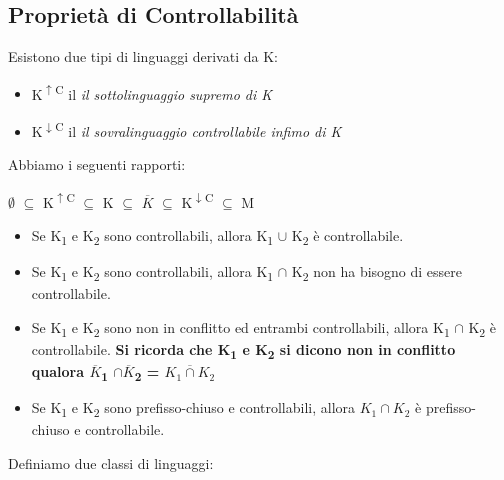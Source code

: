 \documentclass[a4paper, 11pt]{article}
\begin{document}
\subsection{Proprietà di Controllabilità}
Esistono due tipi di linguaggi derivati da K:
\begin{itemize}
\item K\textsuperscript{$\uparrow$C} il \textit{il sottolinguaggio supremo di K}
\item K\textsuperscript{$\downarrow$C} il \textit{il sovralinguaggio controllabile infimo di K}
\end{itemize}
Abbiamo i seguenti rapporti: 
\begin{center}
$\emptyset$ $\subseteq$ K\textsuperscript{$\uparrow$C} $\subseteq$ K $\subseteq$ $\overline{K}$ $\subseteq$ K\textsuperscript{$\downarrow$C} $\subseteq$ M
\end{center}
\begin{itemize}
\item Se K\textsubscript{1} e K\textsubscript{2} sono controllabili, allora K\textsubscript{1} $\cup$ K\textsubscript{2} è controllabile. 
\item Se K\textsubscript{1} e K\textsubscript{2} sono controllabili, allora K\textsubscript{1} $\cap$ K\textsubscript{2} non ha bisogno di essere controllabile.
\item Se K\textsubscript{1} e K\textsubscript{2} sono non in conflitto ed entrambi controllabili, allora K\textsubscript{1} $\cap$ K\textsubscript{2} è controllabile. \textbf{Si ricorda che K\textsubscript{1} e K\textsubscript{2} si dicono non in conflitto qualora $\overline{K}$\textsubscript{1} $\cap \overline{K}$\textsubscript{2} = $\overline{ K_1 \cap K_2 }$ }
\item Se K\textsubscript{1} e K\textsubscript{2} sono prefisso-chiuso e controllabili, allora $K_1 \cap K_2$ è prefisso-chiuso e controllabile.
\end{itemize}
Definiamo due classi di linguaggi: 
\begin{center}
\end{center}
\begin{center}
\end{center}
\end{document}
